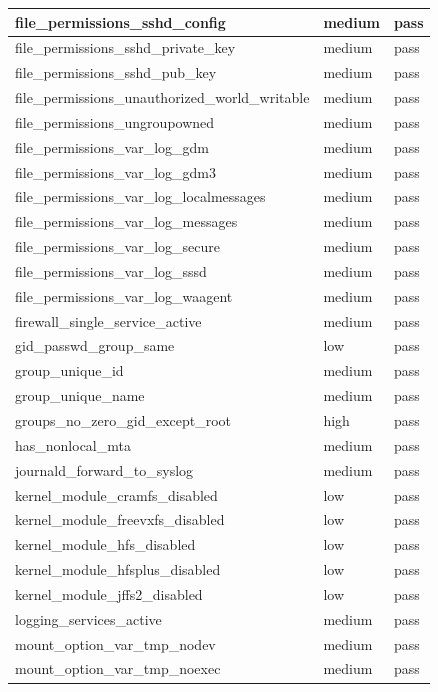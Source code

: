 \begin{longtable}{|p{10cm}|p{2cm}|p{2cm}|}
\hline
file\_permissions\_sshd\_config & medium & pass \\
\hline
file\_permissions\_sshd\_private\_key & medium & pass \\
\hline
file\_permissions\_sshd\_pub\_key & medium & pass \\
\hline
file\_permissions\_unauthorized\_world\_writable & medium & pass \\
\hline
file\_permissions\_ungroupowned & medium & pass \\
\hline
file\_permissions\_var\_log\_gdm & medium & pass \\
\hline
file\_permissions\_var\_log\_gdm3 & medium & pass \\
\hline
file\_permissions\_var\_log\_localmessages & medium & pass \\
\hline
file\_permissions\_var\_log\_messages & medium & pass \\
\hline
file\_permissions\_var\_log\_secure & medium & pass \\
\hline
file\_permissions\_var\_log\_sssd & medium & pass \\
\hline
file\_permissions\_var\_log\_waagent & medium & pass \\
\hline
firewall\_single\_service\_active & medium & pass \\
\hline
gid\_passwd\_group\_same & low & pass \\
\hline
group\_unique\_id & medium & pass \\
\hline
group\_unique\_name & medium & pass \\
\hline
groups\_no\_zero\_gid\_except\_root & high & pass \\
\hline
has\_nonlocal\_mta & medium & pass \\
\hline
journald\_forward\_to\_syslog & medium & pass \\
\hline
kernel\_module\_cramfs\_disabled & low & pass \\
\hline
kernel\_module\_freevxfs\_disabled & low & pass \\
\hline
kernel\_module\_hfs\_disabled & low & pass \\
\hline
kernel\_module\_hfsplus\_disabled & low & pass \\
\hline
kernel\_module\_jffs2\_disabled & low & pass \\
\hline
logging\_services\_active & medium & pass \\
\hline
mount\_option\_var\_tmp\_nodev & medium & pass \\
\hline
mount\_option\_var\_tmp\_noexec & medium & pass \\

\end{longtable}
